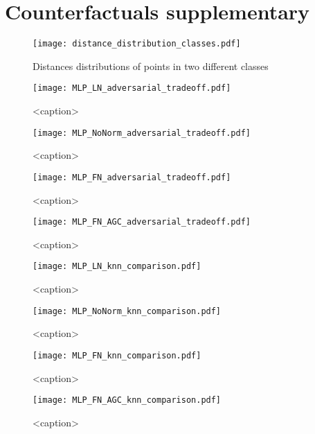 \chapter{Counterfactuals supplementary}\label{chap:interpretability_appendix}

\begin{figure}[htbp]
    \centering
    \begin{subcaptiongroup}
        \texttt{[image: distance\_distribution\_classes.pdf]}
        \label{fig:dist_cls_distibutionL1}
        \label{fig:dist_cls_distibutionL2}
        \label{fig:dist_cls_distibutionLiinf}
    \end{subcaptiongroup}
    \caption{Distances distributions of points in two different classes}\label{fig:dist_cls_distibution}
\end{figure}

\begin{figure}[htbp]
    \centering
    \texttt{[image: MLP\_LN\_adversarial\_tradeoff.pdf]}
    \caption{<caption>}\label{fig:mlp_ln_adv_tradeoff}
\end{figure}

\begin{figure}[htbp]
    \centering
    \texttt{[image: MLP\_NoNorm\_adversarial\_tradeoff.pdf]}
    \caption{<caption>}\label{fig:mlp_nonorm_adv_tradeoff}
\end{figure}

\begin{figure}[htbp]
    \centering
    \texttt{[image: MLP\_FN\_adversarial\_tradeoff.pdf]}
    \caption{<caption>}\label{fig:mlp_fn_adv_tradeoff}
\end{figure}

\begin{figure}[htbp]
    \centering
    \texttt{[image: MLP\_FN\_AGC\_adversarial\_tradeoff.pdf]}
    \caption{<caption>}\label{fig:mlp_fnagcadv_tradeoff}
\end{figure}

\begin{landscape}
    \begin{figure}[htbp]
        \centering
        \texttt{[image: MLP\_LN\_knn\_comparison.pdf]}
        \caption{<caption>}\label{fig:mlp_ln_knn_comp}
    \end{figure}

    \begin{figure}[htbp]
        \centering
        \texttt{[image: MLP\_NoNorm\_knn\_comparison.pdf]}
        \caption{<caption>}\label{fig:mlp_nonorm_knn_comp}
    \end{figure}

    \begin{figure}[htbp]
        \centering
        \texttt{[image: MLP\_FN\_knn\_comparison.pdf]}
        \caption{<caption>}\label{fig:mlp_fn_knn_comp}
    \end{figure}

    \begin{figure}[htbp]
        \centering
        \texttt{[image: MLP\_FN\_AGC\_knn\_comparison.pdf]}
        \caption{<caption>}\label{fig:mlp_fnagc_knn_comp}
    \end{figure}
\end{landscape}